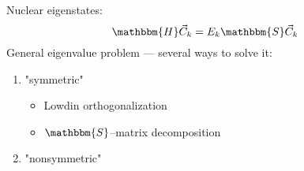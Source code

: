 \begin{frame}{}
\begin{block}{Nuclear eigenstates:}
$$\mathbbm{H}\vec{C}_k = E_k\mathbbm{S}\vec{C}_k$$
General eigenvalue problem --- several ways to solve it:
\begin{enumerate}
\item "symmetric"
\begin{itemize}
\item Lowdin orthogonalization
\item $\mathbbm{S}$--matrix decomposition
\end{itemize}
\item "nonsymmetric"
\end{enumerate}
\end{block}
\end{frame}

